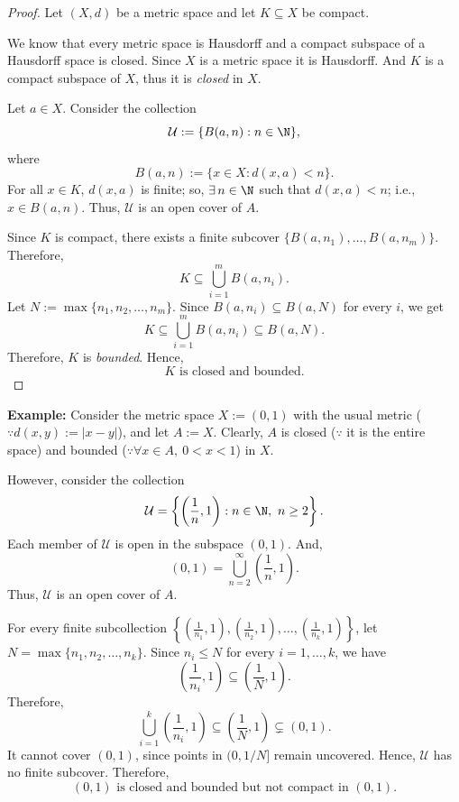 
\begin{proof}
Let $(X,d)$ be a metric space and let $K\subseteq X$ be compact.

We know that every metric space is Hausdorff and a compact subspace of a Hausdorff space is
closed. Since $X$ is a metric space it is Hausdorff. And $K$ is a compact subspace of $X$, thus
it is \emph{closed} in $X$.

Let $a\in X$. Consider the collection
\[ \mathcal{U}:=\{B(a,n):n\in\N\}, \]
where
\[ B(a,n):=\{x\in X:d(x,a)<n\}. \]
For all $x\in K$, $d(x,a)$ is finite; so, $\exists\,n\in\N$ such that $d(x,a)<n$; i.e.,
$x\in B(a,n)$. Thus, $\mathcal{U}$ is an open cover of $A$.

Since $K$ is compact, there exists a finite subcover $\{B(a,n_1),\dots,B(a,n_m)\}$. Therefore,
\[ K\subseteq\bigcup_{i=1}^m B(a,n_i). \]
Let $N:=\max\{n_1,n_2,\dots,n_m\}$. Since $B(a,n_i)\subseteq B(a,N)$ for every $i$, we get
\[ K\subseteq\bigcup_{i=1}^m B(a,n_i)\subseteq B(a,N). \]
Therefore, $K$ is \emph{bounded}. Hence,
\[ \boxed{K \text{ is closed and bounded.}} \]
\end{proof}

\textbf{Example:}
Consider the metric space $X:=(0,1)$ with the usual metric ($\because d(x,y):=|x-y|$), and let
$A:=X$. Clearly, $A$ is closed ($\because$ it is the entire space) and bounded
($\because \forall x\in A,\ 0<x<1$) in $X$.

However, consider the collection
\[ \mathcal{U}=\left\{\left(\frac1n,1\right):n\in\N,\ n\ge2\right\}. \]
Each member of $\mathcal{U}$ is open in the subspace $(0,1)$. And,
\[ (0,1)=\bigcup_{n=2}^\infty\left(\frac1n,1\right). \]
Thus, $\mathcal{U}$ is an open cover of $A$.

For every finite subcollection
$\left\{\left(\frac1{n_1},1\right),\left(\frac1{n_2},1\right),\dots,\left(\frac1{n_k},1\right)\right\}$,
let $N=\max\{n_1,n_2,\dots,n_k\}$. Since $n_i\le N$ for every $i=1,\dots,k$, we have
\[ \left(\frac1{n_i},1\right)\subseteq\left(\frac1N,1\right). \]
Therefore,
\[ \bigcup_{i=1}^k\left(\frac1{n_i},1\right)\subseteq\left(\frac1N,1\right)\subsetneq(0,1). \]
It cannot cover $(0,1)$, since points in $(0,1/N]$ remain uncovered. Hence, $\mathcal{U}$ has no
finite subcover. Therefore,
\[ \boxed{(0,1) \text{ is closed and bounded but not compact in } (0,1).} \]
